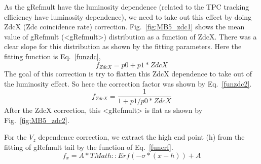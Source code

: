 \documentclass[a4paper]{article}
\begin{document}
As the gRefmult have the luminosity dependence (related to the TPC tracking efficiency have luminosity dependence), we need to take out this effect by doing ZdcX (Zdc coincidence rate) correction. Fig.~\ref{fig:MB5_zdc1} shows the mean value of gRefmult (<gRefmult>) distribution as a function of ZdcX. There was a clear slope for this distribution as shown by the fitting parameters. Here the fitting function is Eq.~\ref{funzdc},
\begin{equation}
f_{ZdcX} = p0 + p1*ZdcX
\label{funzdc}
\end{equation}
The goal of this correction is try to flatten this ZdcX dependence to take out of the luminosity effect. So here the correction factor was shown by  Eq.~\ref{funzdc2}.
\begin{equation}
f_{ZdcX} = \frac{1}{1 + p1/p0*ZdcX}
\label{funzdc2}
\end{equation}
After the ZdcX correction, this <gRefmult> is flat as shown by Fig.~\ref{fig:MB5_zdc2}.

For the $V_{z}$ dependence correction, we extract the high end point (h) from the fitting of gRefmult tail by the function of Eq.~\ref{funerf}.
\begin{equation}
f_{x} = A * TMath::Erf(-\sigma*(x-h)) + A
\label{funerf}
\end{equation}
\end{document}
